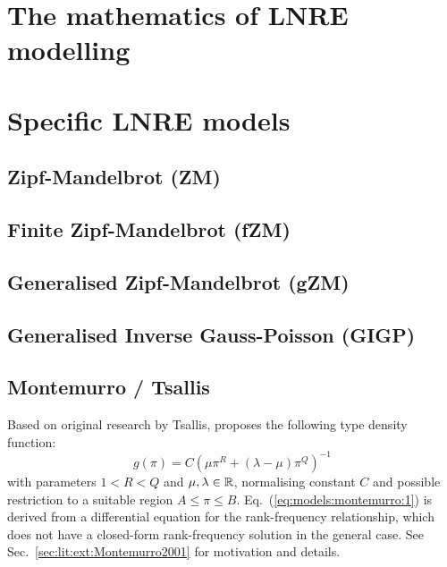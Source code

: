 \documentclass[a4paper]{article}
\begin{document}
\section{The mathematics of LNRE modelling}
\label{sec:lnre}


\section{Specific LNRE models}
\label{sec:models}

\subsection{Zipf-Mandelbrot (ZM)}
\label{sec:models:zm}

\subsection{Finite Zipf-Mandelbrot (fZM)}
\label{sec:models:fzm}

\subsection{Generalised Zipf-Mandelbrot (gZM)}
\label{sec:models:gzm}

\subsection{Generalised Inverse Gauss-Poisson (GIGP)}
\label{sec:models:gigp}

\subsection{Montemurro / Tsallis}
\label{sec:models:montemurro}

Based on original research by Tsallis,  \citet{Montemurro:01} proposes the following type density function:
\begin{equation}
  \label{eq:models:montemurro:1}
  g(\pi) = C \left( \mu \pi^R + (\lambda - \mu) \pi^Q  \right)^{-1}
\end{equation}
with parameters $1 < R < Q$ and $\mu, \lambda\in \mathbb{R}$, normalising constant $C$ and possible restriction to a suitable region $A\leq \pi\leq B$.  Eq.~(\ref{eq:models:montemurro:1}) is derived from a differential equation for the rank-frequency relationship, which does not have a closed-form rank-frequency solution in the general case.  See Sec.~\ref{sec:lit:ext:Montemurro2001} for motivation and details.
\end{document}
